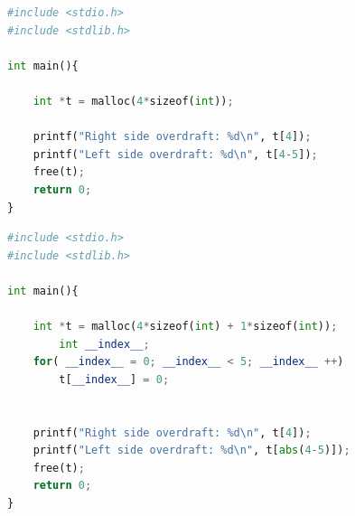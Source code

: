 \documentclass[12pt,oneside]{memoir}
\theoremstyle{plain}
\theoremstyle{definition}
\begin{document}
\begin{lstlisting}[style=mystyle,caption={Program koji sadrži grešku nevalidnog čitanja/pisanja}, label={lst:program3},language={Python}] 
#include <stdio.h>
#include <stdlib.h>

int main(){

	int *t = malloc(4*sizeof(int));

	printf("Right side overdraft: %d\n", t[4]);
	printf("Left side overdraft: %d\n", t[4-5]);
	free(t); 
	return 0;
}
\end{lstlisting}

\begin{lstlisting}[style=mystyle,caption={Predlog rešenja alata \textit{Koronka} za greške otkrivene u programu sa listinga \ref{lst:program3}}, label={lst:program3Fix},language={Python}] 
#include <stdio.h>
#include <stdlib.h>

int main(){

	int *t = malloc(4*sizeof(int) + 1*sizeof(int));
		int __index__;
	for( __index__ = 0; __index__ < 5; __index__ ++)
		t[__index__] = 0;


	printf("Right side overdraft: %d\n", t[4]);
	printf("Left side overdraft: %d\n", t[abs(4-5)]);
	free(t); 
	return 0;
}
\end{lstlisting}
\end{document}
